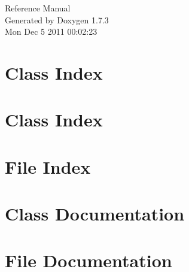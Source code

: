 \documentclass[a4paper]{book}
\begin{document}
\hypersetup{pageanchor=false}
\begin{titlepage}
\vspace*{7cm}
\begin{center}
{\Large Reference Manual}\\
\vspace*{1cm}
{\large Generated by Doxygen 1.7.3}\\
\vspace*{0.5cm}
{\small Mon Dec 5 2011 00:02:23}\\
\end{center}
\end{titlepage}
\clearemptydoublepage
{}
\tableofcontents
\clearemptydoublepage
{}
\hypersetup{pageanchor=true}
\chapter{Class Index}

\chapter{Class Index}

\chapter{File Index}

\chapter{Class Documentation}

























\chapter{File Documentation}

















\printindex
\end{document}

